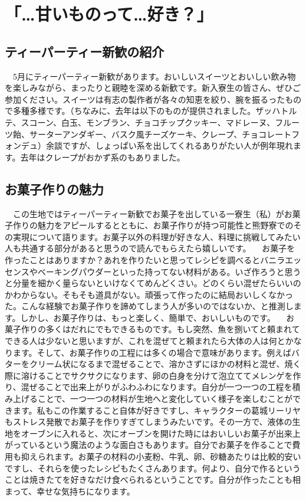 \section{「\dots 甘いものって\dots 好き？」}

\subsection{ティーパーティー新歓の紹介}
　5月にティーパーティー新歓があります。おいしいスイーツとおいしい飲み物を楽しみながら、まったりと親睦を深める新歓です。新入寮生の皆さん、ぜひご参加ください。スイーツは有志の製作者が各々の知恵を絞り、腕を振るったもので多種多様です。（ちなみに、去年は以下のものが提供されました。ザッハトルテ、スコーン、白玉、モンブラン、チョコチップクッキー、マドレーヌ、フルーツ飴、サーターアンダギー、バスク風チーズケーキ、クレープ、チョコレートフォンデュ）余談ですが、しょっぱい系を出してくれるありがたい人が例年現れます。去年はクレープがおかず系のもありました。

\subsection{お菓子作りの魅力}
　この生地ではティーパーティー新歓でお菓子を出している一寮生（私）がお菓子作りの魅力をアピールするとともに、お菓子作りが持つ可能性と熊野寮でのその実現について語ります。お菓子以外の料理が好きな人、料理に挑戦してみたい人も共通する部分があると思うので読んでもらえたら嬉しいです。
　お菓子を作ったことはありますか？あれを作りたいと思ってレシピを調べるとバニラエッセンスやベーキングパウダーといった持ってない材料がある。いざ作ろうと思うと分量を細かく量らないといけなくてめんどくさい。どのくらい混ぜたらいいのかわからない。そもそも道具がない。頑張って作ったのに結局おいしくなかった。こんな経験でお菓子作りを諦めてしまう人が多いのではないか、と推測します。しかし、お菓子作りは、もっと楽しく、簡単で、おいしいものです。
　お菓子作りの多くはだれにでもできるものです。もし突然、魚を捌いてと頼まれてできる人は少ないと思いますが、これを混ぜてと頼まれたら大体の人は何とかなります。そして、お菓子作りの工程には多くの場合で意味があります。例えばバターをクリーム状になるまで混ぜることで、溶かさずにほかの材料と混ぜ、焼く際に溶けることでサクサクになります、卵の白身を分けて泡立ててメレンゲを作り、混ぜることで出来上がりがふわふわになります。自分が一つ一つの工程を積み上げることで、一つ一つの材料が生地へと変化していく様子を楽しむことができます。私もこの作業すること自体が好きですし、キャラクターの葛城リーリヤもストレス発散でお菓子を作りすぎてしまうみたいです。その一方で、液体の生地をオーブンに入れると、次にオーブンを開けた時にはおいしいお菓子が出来上がっているという魔法のような面白さもあります。自分でお菓子を作ることで費用も抑えられます。お菓子の材料の小麦粉、牛乳、卵、砂糖あたりは比較的安いですし、それらを使ったレシピもたくさんあります。何より、自分で作るということは焼きたてを好きなだけ食べられるということです。自分が作ったことも相まって、幸せな気持ちになります。

